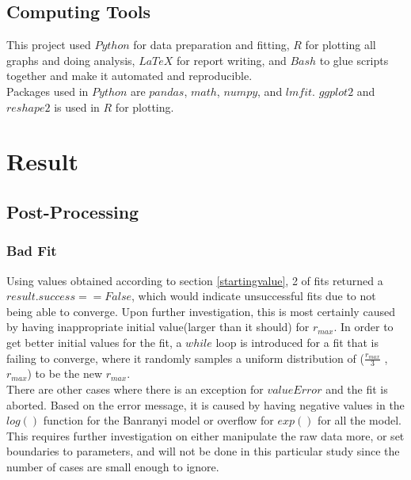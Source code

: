\documentclass[11pt]{article}
\begin{document}
\subsection{Computing Tools}
This project used $Python$ for data preparation and fitting, $R$ for plotting all graphs and doing analysis, $LaTeX$ for report writing, and $Bash$ to glue scripts together and make it automated and reproducible.\\
Packages used in $Python$ are $pandas$, $math$, $numpy$, and $lmfit$. $ggplot2$ and $reshape2$ is used in $R$ for plotting.

\section{Result}
\subsection{Post-Processing}
\subsubsection{Bad Fit}
Using values obtained according to section \ref{startingvalue}, 2 of fits returned a $result.success == False$, which would indicate unsuccessful fits due to not being able to converge. Upon further investigation, this is most certainly caused by having inappropriate initial value(larger than it should) for $r_{max}$. In order to get better initial values for the fit, a $while$ loop is introduced for a fit that is failing to converge, where it randomly samples a uniform distribution of ($\frac{r_{max}}{3}$ , $r_{max}$) to be the new $r_{max}$.\\
There are other cases where there is an exception for $valueError$ and the fit is aborted. Based on the error message, it is caused by having negative values in the $log()$ function for the Banranyi model or overflow for $exp()$ for all the model. This requires further investigation on either manipulate the raw data more, or set boundaries to parameters, and will not be done in this particular study since the number of cases are small enough to ignore.
\end{document}
